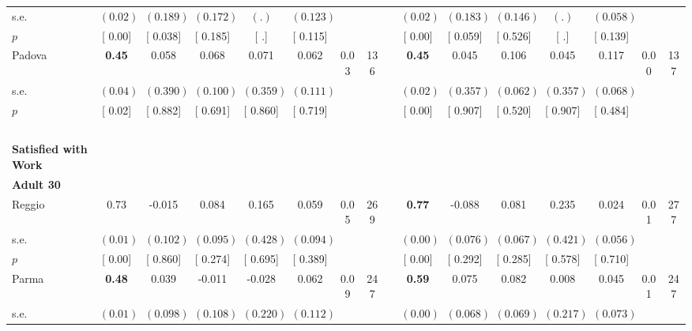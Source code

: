 \begin{longtable}{L{8em} c c c c c c c p{1em} c c c c c c c}
\quad \quad \quad \quad s.e.& $ (     0.02)$ & $ (    0.189)$ & $ (    0.172)$ & $ (        .)$ & $ (    0.123)$ & & & & $ (     0.02)$ & $ (    0.183)$ & $ (    0.146)$ & $ (        .)$ & $ (    0.058)$ & &  \\*
\quad \quad \quad \quad $ p$ & [     0.00] & [    0.038] & [    0.185] & [        .] & [    0.115] & & & & [     0.00] & [    0.059] & [    0.526] & [        .] & [    0.139] & &  \\[1em]
\quad \quad \quad Padova& \textbf{     0.45} &     0.058 &     0.068 &     0.071 &     0.062 &      0.03 &       136 & & \textbf{     0.45} &     0.045 &     0.106 &     0.045 &     0.117 &      0.00 &       137  \\*
\quad \quad \quad \quad s.e.& $ (     0.04)$ & $ (    0.390)$ & $ (    0.100)$ & $ (    0.359)$ & $ (    0.111)$ & & & & $ (     0.02)$ & $ (    0.357)$ & $ (    0.062)$ & $ (    0.357)$ & $ (    0.068)$ & &  \\*
\quad \quad \quad \quad $ p$ & [     0.02] & [    0.882] & [    0.691] & [    0.860] & [    0.719] & & & & [     0.00] & [    0.907] & [    0.520] & [    0.907] & [    0.484] & &  \\[1em]
~\\[1em]
\textbf{Satisfied with Work} \\*
\quad \quad \textbf{Adult 30} & & & & & & & & & & & & & & & \\* 
\quad \quad \quad Reggio& 0.73 &    -0.015 &     0.084 &     0.165 &     0.059 &      0.05 &       269 & & \textbf{     0.77} &    -0.088 &     0.081 &     0.235 &     0.024 &      0.01 &       277  \\*
\quad \quad \quad \quad s.e.& $ (     0.01)$ & $ (    0.102)$ & $ (    0.095)$ & $ (    0.428)$ & $ (    0.094)$ & & & & $ (     0.00)$ & $ (    0.076)$ & $ (    0.067)$ & $ (    0.421)$ & $ (    0.056)$ & &  \\*
\quad \quad \quad \quad $ p$ & [     0.00] & [    0.860] & [    0.274] & [    0.695] & [    0.389] & & & & [     0.00] & [    0.292] & [    0.285] & [    0.578] & [    0.710] & &  \\[1em]
\quad \quad \quad Parma& \textbf{     0.48} &     0.039 &    -0.011 &    -0.028 &     0.062 &      0.09 &       247 & & \textbf{     0.59} &     0.075 &     0.082 &     0.008 &     0.045 &      0.01 &       247  \\*
\quad \quad \quad \quad s.e.& $ (     0.01)$ & $ (    0.098)$ & $ (    0.108)$ & $ (    0.220)$ & $ (    0.112)$ & & & & $ (     0.00)$ & $ (    0.068)$ & $ (    0.069)$ & $ (    0.217)$ & $ (    0.073)$ & &  \\*

\end{longtable}
